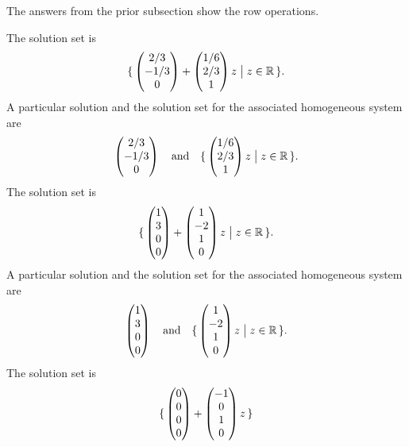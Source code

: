 \begin{exercises}
    \begin{answer}
      The answers from the prior subsection show the row operations.
    \begin{exparts}
      \partsitem
        The solution set is
        \begin{equation*}
          \mbox{$\{\,\begin{pmatrix} 2/3 \\ -1/3 \\ 0 \end{pmatrix}
               +\begin{pmatrix} 1/6 \\ 2/3 \\ 1 \end{pmatrix}z
              \bigm| z\in\mathbb{R}\,\}$}.
        \end{equation*}
        A particular solution and the solution set for the associated
        homogeneous system are
        \begin{equation*}
          \begin{pmatrix} 2/3 \\ -1/3 \\ 0 \end{pmatrix}
            \quad\text{and}\quad
        \mbox{$\{\,\begin{pmatrix} 1/6 \\ 2/3 \\ 1 \end{pmatrix}z
            \bigm| z\in\mathbb{R}\,\}$}.
        \end{equation*}
      \partsitem
        The solution set is
        \begin{equation*}
          \mbox{$\{\,\begin{pmatrix} 1 \\ 3 \\ 0 \\ 0 \end{pmatrix}
               +\begin{pmatrix} 1 \\-2 \\ 1 \\ 0 \end{pmatrix}z
              \bigm| z\in\mathbb{R}\,\}$}.
        \end{equation*}
        A particular solution and the solution set for the associated
        homogeneous system are
        \begin{equation*}
          \begin{pmatrix} 1 \\ 3 \\ 0 \\ 0 \end{pmatrix}
            \quad\text{and}\quad
          \mbox{$\{\,\begin{pmatrix} 1 \\ -2 \\ 1 \\ 0 \end{pmatrix}z
              \bigm| z\in\mathbb{R}\,\}$}.
        \end{equation*}
      \partsitem
        The solution set is
        \begin{equation*}
          \mbox{$\{\,\begin{pmatrix} 0 \\ 0 \\ 0 \\ 0 \end{pmatrix}
               +\begin{pmatrix} -1 \\ 0 \\ 1 \\ 0 \end{pmatrix}z
\,\}$}
\end{equation*}
\end{exparts}
\end{answer}
\end{exercises}
